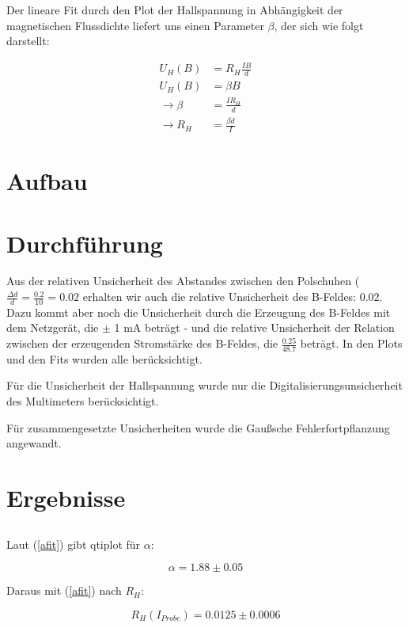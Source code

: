 \documentclass[12pt,a4paper,twopage]{article}
\begin{document}
Der lineare Fit durch den Plot der Hallspannung in Abhängigkeit der magnetischen Flussdichte liefert uns einen Parameter $\beta$, der sich wie folgt darstellt:

\begin{equation}\label{bfit}
\begin{split}
U_H(B)& = R_H \frac{I B}{d} \\
U_H(B)& = \beta B \\
\rightarrow \beta & = \frac{I R_H}{d} \\
\rightarrow R_H & = \frac{\beta d}{I}
\end{split}
\end{equation}



\section{Aufbau}

\section{Durchführung}
Aus der relativen Unsicherheit des Abstandes zwischen den Polschuhen ($\frac{\Delta d}{d}= \frac{0.2}{10} = 0.02 $ erhalten wir auch die relative Unsicherheit des B-Feldes:  0.02. Dazu kommt aber noch die Unsicherheit durch die Erzeugung des B-Feldes mit dem Netzgerät, die $\pm$ 1 mA beträgt - und die relative Unsicherheit der Relation zwischen der erzeugenden Stromstärke des B-Feldes, die $\frac{0.25}{48.7}$ beträgt. In den Plots und den Fits wurden alle berücksichtigt. 

Für die Unsicherheit der Hallspannung wurde nur die Digitalisierungsunsicherheit des Multimeters berücksichtigt. 

Für zusammengesetzte Unsicherheiten wurde die Gaußsche Fehlerfortpflanzung angewandt.
\section{Ergebnisse}
\subsection*{}

Laut (\ref{afit}) gibt qtiplot für $\alpha$:

$$ \alpha = 1.88 \pm 0.05 $$

Daraus mit (\ref{afit}) nach $R_H$:

\begin{center}
$$ \boxed{ R_H(I_{Probe}) = 0.0125 \pm 0.0006 } $$
\end{center}
\end{document}
